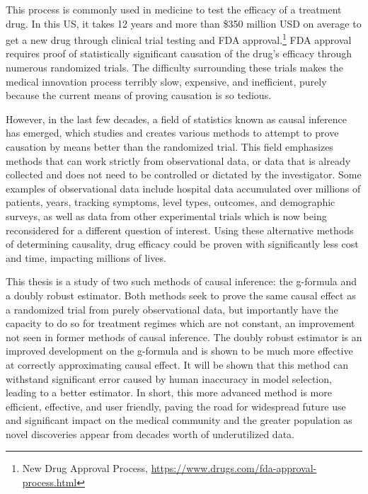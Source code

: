  This process is commonly used in medicine to test the efficacy of a treatment drug.  In this US, it takes 12 years and more than \$350 million USD on average to get a new drug through clinical trial testing and FDA approval.\footnote{New Drug Approval Process, \url{https://www.drugs.com/fda-approval-process.html}}  FDA approval requires proof of statistically significant causation of the drug's efficacy through numerous randomized trials.  The difficulty surrounding these trials makes the medical innovation process terribly slow, expensive, and inefficient, purely because the current means of proving causation is so tedious.  
 
However, in the last few decades, a field of statistics known as causal inference has emerged, which studies and creates various methods to attempt to prove causation by means better than the randomized trial.  This field emphasizes methods that can work strictly from observational data, or data that is already collected and does not need to be controlled or dictated by the investigator.  Some examples of observational data include hospital data accumulated over millions of patients, years, tracking symptoms, level types, outcomes, and demographic surveys, as well as data from other experimental trials which is now being reconsidered for a different question of interest.  Using these alternative methods of determining causality, drug efficacy could be proven with significantly less cost and time, impacting millions of lives.  

This thesis is a study of two such methods of causal inference: the g-formula and a doubly robust estimator.  Both methods seek to prove the same causal effect as a randomized trial from purely observational data, but importantly have the capacity to do so for treatment regimes which are not constant, an improvement not seen in former methods of causal inference.  The doubly robust estimator is an improved development on the g-formula and is shown to be much more effective at correctly approximating causal effect.  It will be shown that this method can withstand significant error caused by human inaccuracy in model selection, leading to a better estimator.  In short, this more advanced method is more efficient, effective, and user friendly, paving the road for widespread future use and significant impact on the medical community and the greater population as novel discoveries appear from decades worth of underutilized data.  



